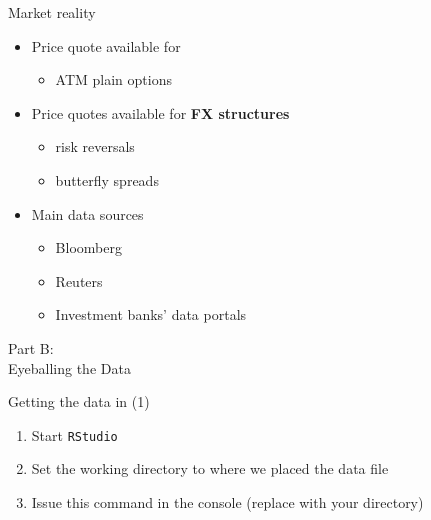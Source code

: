 \begin{frame}{Market reality}

\begin{itemize}
\tightlist
\item
  Price quote available for

  \begin{itemize}
  \tightlist
  \item
    ATM plain options
  \end{itemize}
\item
  Price quotes available for \textbf{FX structures}

  \begin{itemize}
  \tightlist
  \item
    risk reversals
  \item
    butterfly spreads
  \end{itemize}
\item
  Main data sources

  \begin{itemize}
  \tightlist
  \item
    Bloomberg
  \item
    Reuters
  \item
    Investment banks' data portals
  \end{itemize}
\end{itemize}

\end{frame}

\begin{frame}{}

\color{blue} \LARGE{Part B:}\\
\LARGE{Eyeballing the Data}

\end{frame}

\begin{frame}[fragile]{Getting the data in (1)}

\begin{enumerate}
\def\labelenumi{\arabic{enumi}.}
\tightlist
\item
  Start \texttt{RStudio}
\item
  Set the working directory to where we placed the data file
\item
  Issue this command in the console (replace with your directory)
\end{enumerate}

\begin{Shaded}
\begin{Highlighting}[]
  
\end{Highlighting}
\end{Shaded}

\end{frame}

